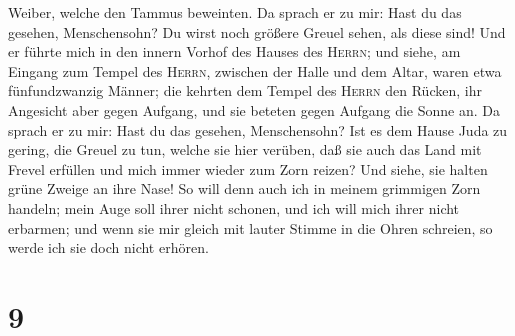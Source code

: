 Weiber, welche den Tammus beweinten.  Da sprach er zu
mir: Hast du das gesehen, Menschensohn? Du wirst noch größere Greuel
sehen, als diese sind!  Und er führte mich in den innern
Vorhof des Hauses des \textsc{Herrn}; und siehe, am Eingang zum Tempel
des \textsc{Herrn}, zwischen der Halle und dem Altar, waren etwa
fünfundzwanzig Männer; die kehrten dem Tempel des \textsc{Herrn} den
Rücken, ihr Angesicht aber gegen Aufgang, und sie beteten gegen Aufgang
die Sonne an.  Da sprach er zu mir: Hast du das gesehen,
Menschensohn? Ist es dem Hause Juda zu gering, die Greuel zu tun, welche
sie hier verüben, daß sie auch das Land mit Frevel erfüllen und mich
immer wieder zum Zorn reizen? Und siehe, sie halten grüne Zweige an ihre
Nase!  So will denn auch ich in meinem grimmigen Zorn
handeln; mein Auge soll ihrer nicht schonen, und ich will mich ihrer
nicht erbarmen; und wenn sie mir gleich mit lauter Stimme in die Ohren
schreien, so werde ich sie doch nicht erhören.

\hypertarget{section-8}{%
\section{9}\label{section-8}}

